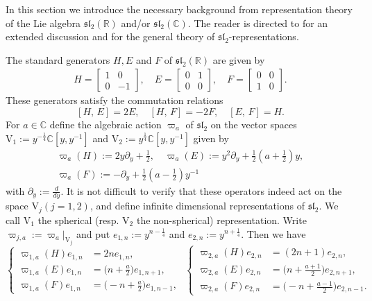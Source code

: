 \documentclass[11pt]{article}
\numberwithin{equation}{section}
\newcommand{\R}{\mathbb{R}} %
\newcommand{\C}{\mathbb{C}} %
\newcommand{\RpnSymbol}[1]{\bm{\mathrm{#1}}}
\newcommand{\rV}{\RpnSymbol{V}}
\theoremstyle{plain}
\theoremstyle{definition}
\theoremstyle{remark}
\begin{document}
In this section we introduce the necessary background from representation theory
of the Lie algebra \(\mathfrak{sl}_2(\R)\) and/or \(\mathfrak{sl}_2(\C)\). The reader is directed to \cite{W2016JPA} for an extended discussion and \cite{L,HT1992} for the
general theory of \(\mathfrak{sl}_2\)-representations.

The standard generators $H, E$ and $F$ of $\mathfrak{sl}_2(\R)$ are given by
\begin{align*}
  H= \begin{bmatrix}
    1 & 0  \\
    0 &  -1
  \end{bmatrix},\quad
  E= \begin{bmatrix}
    0 & 1  \\
    0 &  0
  \end{bmatrix},\quad
  F= \begin{bmatrix}
    0 & 0  \\
    1 &  0
  \end{bmatrix}.
\end{align*}
These generators satisfy the commutation relations
\[
  [H,\, E] = 2E,\quad [H,\, F] = -2F,\quad  [E,\, F] = H.
\]
For \(a \in \C\) define the algebraic action \(\varpi_a\) of $\mathfrak{sl}_2$ on
the vector spaces $\rV_{1}:= y^{-\frac14} \C[y, y^{-1}]$ and $\rV_{2}:=y^{\frac14} \C[y, y^{-1}]$  given by
\begin{gather*}
  \varpi_a(H) :=2y\partial_y+\frac12,\quad
  \varpi_a(E) :=y^2\partial_y+\frac12(a+\frac12)y,\\
  \varpi_a(F) := -\partial_y+\frac12(a-\frac12)y^{-1}
\end{gather*}
with \(\partial_y := \frac{d}{d y} \). It is not difficult to verify that these operators indeed act on the
space $\rV_j (j=1,2)$, and define infinite dimensional representations of $\mathfrak{sl}_2$. 
We call $\rV_1$ the spherical (resp. $\rV_2$ the non-spherical) representation.
Write  $\varpi_{j,a} :=\varpi_a|_{\rV_{j}}$ and put $e_{1,n}:=y^{n-\frac14}$ and $ e_{2,n}:=y^{n+\frac14}$.
Then we have
\begin{equation*}
  \left\{
  \begin{aligned}
    \varpi_{1,a}(H)e_{1,n} &= 2ne_{1,n},\\
    \varpi_{1,a}(E)e_{1,n} &= \big(n+\frac{a}{2}\big)e_{1,n+1},\\
    \varpi_{1,a}(F)e_{1,n} &= \big(-n+\frac{a}{2}\big)e_{1,n-1},
  \end{aligned}
  \right.
  \,\,
  \left\{
  \begin{aligned}
    \varpi_{2,a}(H)e_{2,n} &= (2n+1)e_{2,n},\\
    \varpi_{2,a}(E)e_{2,n} &= \big(n+\frac{a+1}{2}\big)e_{2,n+1},\\
    \varpi_{2,a}(F)e_{2,n} &= \big(-n+\frac{a-1}{2}\big)e_{2,n-1}.
  \end{aligned}
  \right.
\end{equation*}
\end{document}
